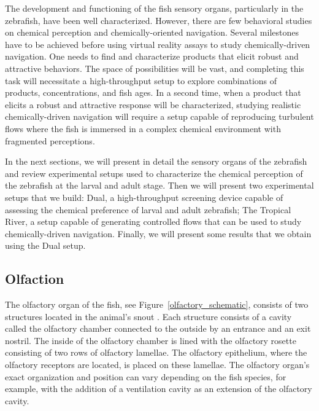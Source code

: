   The development and functioning of the fish sensory organs, particularly in the zebrafish, have been well characterized. However, there are few behavioral studies on chemical perception and chemically-oriented navigation. Several milestones have to be achieved before using virtual reality assays to study chemically-driven navigation. One needs to find and characterize products that elicit robust and attractive behaviors. The space of possibilities will be vast, and completing this task will necessitate a high-throughput setup to explore combinations of products, concentrations, and fish ages. In a second time, when a product that elicits a robust and attractive response will be characterized, studying realistic chemically-driven navigation will require a setup capable of reproducing turbulent flows where the fish is immersed in a complex chemical environment with fragmented perceptions.

  In the next sections, we will present in detail the sensory organs of the zebrafish and review experimental setups used to characterize the chemical perception of the zebrafish at the larval and adult stage. Then we will present two experimental setups that we build: Dual, a high-throughput screening device capable of assessing the chemical preference of larval and adult zebrafish; The Tropical River, a setup capable of generating controlled flows that can be used to study chemically-driven navigation. Finally, we will present some results that we obtain using the Dual setup.


    \subsection{Olfaction}
    The olfactory organ of the fish, see Figure~\ref{olfactory_schematic}, consists of two structures located in the animal's snout \cite{hara2012fish}. Each structure consists of a cavity called the olfactory chamber connected to the outside by an entrance and an exit nostril. The inside of the olfactory chamber is lined with the olfactory rosette consisting of two rows of olfactory lamellae. The olfactory epithelium, where the olfactory receptors are located, is placed on these lamellae. The olfactory organ's exact organization and position can vary depending on the fish species, for example, with the addition of a ventilation cavity as an extension of the olfactory cavity.


